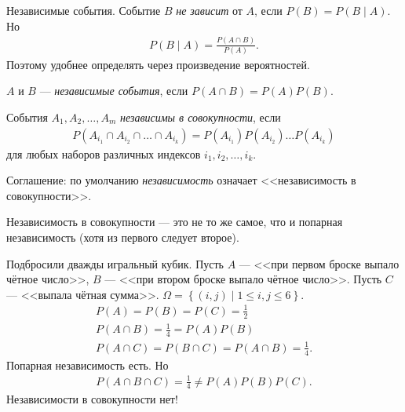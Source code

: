 \documentclass[../main.tex]{subfiles}
\begin{document}
Независимые события. Событие $B$ \textit{не зависит} от $A$, если $P(B) = P(B \mid A)$. Но
\begin{align*}
 P(B \mid A) = \frac{P(A\cap B)}{P(A)}
.\end{align*} Поэтому удобнее определять через произведение вероятностей.

\begin{df}
 $A$ и $B$ --- \textit{независимые события}, если $P(A \cap B) = P(A)P(B)$.
\end{df}
\begin{df}
 События $A_1, A_2, \ldots, A_m$ \textit{независимы в совокупности}, если
 \begin{align*}
  P(A_{i_1} \cap A_{i_2} \cap \ldots \cap A_{i_k}) = P(A_{i_1}) P(A_{i_2}) \ldots P(A_{i_k})
 \end{align*} для любых наборов различных индексов $i_1, i_2, \ldots, i_k$.
\end{df}
Соглашение: по умолчанию \textit{независимость} означает <<независимость в совокупности>>.
\begin{remrk*}
 Независимость в совокупности --- это не то же самое, что и попарная независимость (хотя из первого следует второе).
\end{remrk*}
\begin{exmpl*}
 Подбросили дважды игральный кубик. Пусть $A$ --- <<при первом броске выпало чётное число>>, $B$ --- <<при втором броске выпало чётное число>>. Пусть $C$ --- <<выпала чётная сумма>>. $\Omega = \left\{ (i,j) \mid 1 \leqslant i,j \leqslant 6 \right\}$.
 \begin{align*}
  P(A) = P(B) = P(C) = \frac{1}{2} \\
  P(A \cap B) = \frac{1}{4} = P(A) P(B) \\
  P(A \cap C) = P(B \cap C) = P(A \cap B) = \frac{1}{4}
 .\end{align*} Попарная независимость есть. Но
 \begin{align*}
  P(A \cap B \cap C) = \frac{1}{4} \neq P(A)P(B)P(C)
 .\end{align*} Независимости в совокупности нет!
\end{exmpl*}
\end{document}

